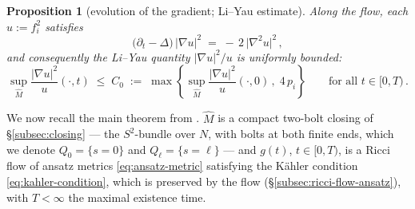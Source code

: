 \documentclass[11pt]{amsart}
\theoremstyle{plain}
\numberwithin{equation}{section}
\newtheorem{proposition}[theorem]{Proposition}
\theoremstyle{definition}
\theoremstyle{remark}
\begin{document}
\begin{proposition}[evolution of the gradient; Li--Yau estimate]\label{prop:li-yau}
	Along the flow, each $u := f_i^2$ satisfies
		\begin{equation}\label{eq:gradient-evolution}
		\big( \partial_t - \Delta \big)\, \big| \nabla u \big|^2 \;=\; -\, 2\, \big| \nabla^2 u \big|^2 \,,
	\end{equation}
	and consequently the Li--Yau quantity \cite{LY} $| \nabla u |^2 / u$ is uniformly bounded:
		\begin{equation}\label{eq:li-yau}
		\sup_{\widehat{M}} \frac{| \nabla u |^2}{u} (\cdot, t) \;\leq\; C_0 \;:=\; \max \left\{ \sup_{\widehat{M}} \frac{| \nabla u |^2}{u} (\cdot, 0) \,, \; 4\, p_i \right\} \qquad \text{for all } t \in [0, T) \,.
	\end{equation}
\end{proposition}
We now recall the main theorem from \cite{FT}. $\widehat{M}$ is a {compact two-bolt closing} of \S\ref{subsec:closing} --- the $S^2$-bundle over $N$, with bolts at both finite ends, which we denote $Q_0 = \{ s = 0 \}$ and $Q_\ell = \{ s = \ell \}$ --- and $g(t)$, $t \in [0, T)$, is a Ricci flow of ansatz metrics \eqref{eq:ansatz-metric} satisfying the Kähler condition \eqref{eq:kahler-condition}, which is preserved by the flow (\S\ref{subsec:ricci-flow-ansatz}), with $T < \infty$ the maximal existence time.

\end{document}
